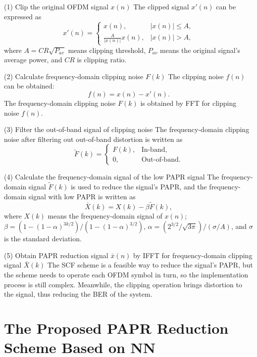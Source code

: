 \documentclass[journal]{IEEEtran}
\begin{document}
(1) Clip the original OFDM signal $x(n)$
The clipped signal $x'(n)$ can be expressed as
\begin{equation}
x'(n) =
\begin{cases}
x(n), & |x(n)| \leq A, \\
\frac{A}{|x(n)|} x(n), & |x(n)| > A,
\end{cases}
\label{eq4}
\end{equation}
where $A = CR \sqrt{P_{av}}$ means clipping threshold, $P_{av}$ means the original signal’s average power, and $CR$ is clipping ratio.

(2) Calculate frequency-domain clipping noise $F(k)$
The clipping noise $f(n)$ can be obtained:
\begin{equation}
f(n) = x(n) - x'(n).
\label{eq5}
\end{equation}
The frequency-domain clipping noise $F(k)$ is obtained by FFT for clipping noise $f(n)$.

(3) Filter the out-of-band signal of clipping noise
The frequency-domain clipping noise after filtering out out-of-band distortion is written as
\begin{equation}
\tilde{F}(k) =
\begin{cases}
F(k), & \text{In-band}, \\
0, & \text{Out-of-band}.
\end{cases}
\label{eq6}
\end{equation}

(4) Calculate the frequency-domain signal of the low PAPR signal
The frequency-domain signal $\tilde{F}(k)$ is used to reduce the signal’s PAPR, and the frequency-domain signal with low PAPR is written as
\begin{equation}
\bar{X}(k) = X(k) - \beta \tilde{F}(k),
\label{eq7}
\end{equation}
where $X(k)$ means the frequency-domain signal of $x(n)$; $\beta = (1 - (1 - \alpha)^{3k/2}) / (1 - (1 - \alpha)^{3/2})$, $\alpha = (2^{3/2} / \sqrt{3\pi}) / (\sigma/A)$, and $\sigma$ is the standard deviation.

(5) Obtain PAPR reduction signal $\bar{x}(n)$ by IFFT for frequency-domain clipping signal $\bar{X}(k)$
The SCF scheme is a feasible way to reduce the signal’s PAPR, but the scheme needs to operate each OFDM symbol in turn, so the implementation process is still complex. Meanwhile, the clipping operation brings distortion to the signal, thus reducing the BER of the system.

\section{The Proposed PAPR Reduction Scheme Based on NN}
\end{document}
